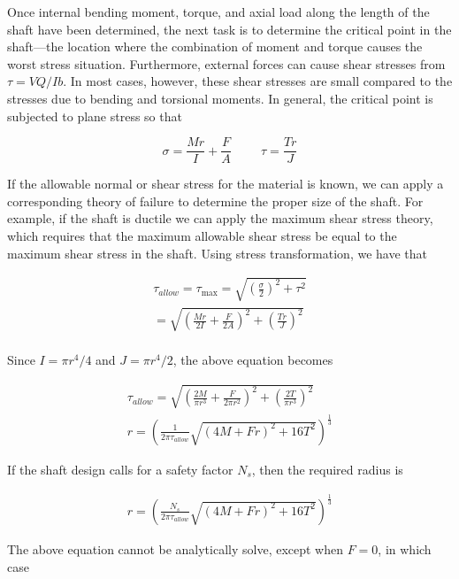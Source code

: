 \documentclass[a4paper,openany,nobib]{tufte-book}
\begin{document}
{{Once internal bending moment, torque, and axial load along the length of
the shaft have been determined, the next task is to determine the
critical point in the shaft---the location where the combination of
moment and torque causes the worst stress situation. Furthermore,
external forces can cause shear stresses from \(\tau = VQ/Ib\). In most
cases, however, these shear stresses are small compared to the stresses
due to bending and torsional moments. In general, the critical point is
subjected to plane stress so that


$$\sigma  = \frac{Mr}{I} + \frac{F}{A} \hspace{1cm} \tau  = \frac{Tr}{J}$$

If the allowable normal or shear stress for the material is known, we
can apply a corresponding theory of failure to determine the proper size
of the shaft. For example, if the shaft is ductile we can apply the
maximum shear stress theory, which requires that the maximum allowable
shear stress be equal to the maximum shear stress in the shaft. Using
stress transformation, we have that

$$\begin{gathered}
    \tau_{allow} = \tau_{\max} = \sqrt {\left( \frac{\sigma}{2} \right)^2 + {\tau ^2}}  \\ 
    = \sqrt{ \left( \frac{Mr}{2I} + \frac{F}{2A} \right)^2 + \left( \frac{Tr}{J} \right)^2}  \\ 
  \end{gathered}$$

Since \(I = \pi r^4/4\) and \(J = \pi r^4/2\), the above equation becomes

$$\begin{gathered}
    \tau_{allow} = \sqrt{ \left( \frac{2M}{\pi r^3} + \frac{F}{2 \pi r^2} \right)^2 + \left( \frac{2T}{\pi r^3} \right)^2 } \\
    r = \left( \frac{1}{2 \pi \tau _{allow}} \sqrt {(4M + Fr)^2 + 16T^2 } \right)^{\frac{1}{3}}
  \end{gathered}$$

If the shaft design calls for a safety factor \(N_s\), then the required
radius is

$$\begin{gathered}
  r = \left( \frac{N_s}{2 \pi \tau _{allow}} \sqrt {(4M + Fr)^2 + 16T^2} \right)^{\frac{1}{3}}\end{gathered}$$

The above equation cannot be analytically solve, except when \(F=0\), in
which case

}}
\end{document}
